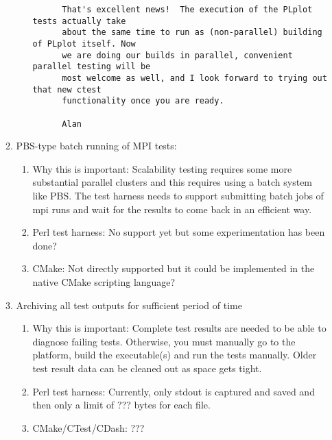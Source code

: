 \documentclass[pdf,ps2pdf,11pt]{SANDreport}
\begin{document}
\begin{enumerate}
\begin{enumerate}
\begin{enumerate}
{\begin{verbatim}
      That's excellent news!  The execution of the PLplot tests actually take
      about the same time to run as (non-parallel) building of PLplot itself. Now
      we are doing our builds in parallel, convenient parallel testing will be
      most welcome as well, and I look forward to trying out that new ctest
      functionality once you are ready.
      
      Alan
      \end{verbatim}}

    \end{enumerate}

  {}\item PBS-type batch running of MPI tests:

    \begin{enumerate}

    {}\item Why this is important: Scalability testing requires some
    more substantial parallel clusters and this requires using a batch
    system like PBS.  The test harness needs to support submitting
    batch jobs of mpi runs and wait for the results to come back in an
    efficient way.

    {}\item Perl test harness: No support yet but some experimentation
    has been done?

    {}\item CMake: Not directly supported but it could be implemented
    in the native CMake scripting language?

    \end{enumerate}

  {}\item Archiving all test outputs for sufficient period of time

    \begin{enumerate}

    {}\item Why this is important: Complete test results are needed to
    be able to diagnose failing tests.  Otherwise, you must manually
    go to the platform, build the executable(s) and run the tests
    manually.  Older test result data can be cleaned out as space gets
    tight.

    {}\item Perl test harness: Currently, only stdout is captured and
    saved and then only a limit of ??? bytes for each file.

    {}\item CMake/CTest/CDash: ???


\end{enumerate}
\end{enumerate}
\end{enumerate}
\end{document}
